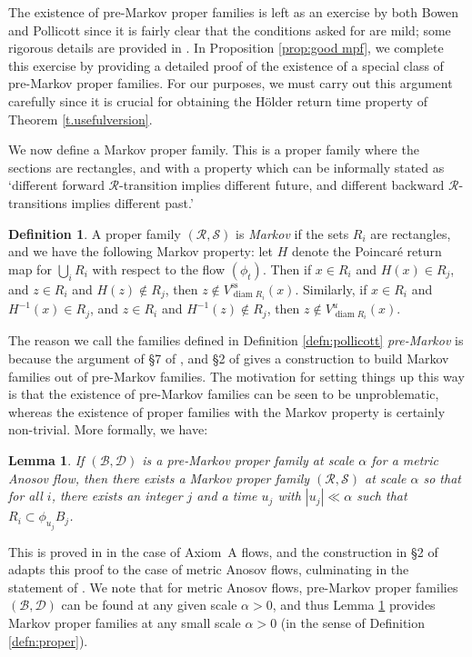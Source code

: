 \documentclass[10pt]{amsart}
\let\mathcal\mathscr
\newcommand{\sts}{\mathrm{ss}}
\newtheorem{lem}[thm]{Lemma}
\theoremstyle{definition}
\newtheorem{defn}[thm]{Definition}
\numberwithin{equation}{section}
\DeclareMathOperator{\diam}{diam}
\newcommand\DDD{\mathcal D}
\newcommand\BBB{\mathcal B}
\newcommand\RRR{\mathcal R}
\newcommand\SSS{\mathcal S}
\begin{document}
The existence of pre-Markov proper families is left as an exercise by both Bowen and Pollicott since it is fairly clear that the conditions asked for are mild; some rigorous details are provided in \cite{BW}. In Proposition \ref{prop:good mpf}, we complete this exercise by providing a detailed proof of the existence of a special class of pre-Markov proper families. For our purposes, we must carry out this argument carefully since it is crucial for obtaining the Hölder return time property of Theorem \ref{t.usefulversion}.

We now define a Markov proper family. This is a proper family where the sections are rectangles, and with a property which can be informally stated as `different forward $\RRR$-transition implies different future, and different backward $\RRR$-transitions implies different past.'

\begin{defn}
A proper family $(\RRR, \SSS)$ is \emph{Markov} if the sets $R_i$ are rectangles, and we have the following Markov property: let $H$ denote the Poincaré return map for $\bigcup_i R_i$ with respect to the flow $(\phi_t)$. Then if $ x \in R_i$ and $ H(x) \in R_j$, and $z \in R_i$ and $H(z) \notin R_j$, then $z \notin V^{\sts}_{\diam R_i}(x)$. Similarly, if $ x \in R_i$ and $ H^{-1}(x) \in R_j$, and $z \in R_i$ and $H^{-1}(z) \notin R_j$, then $z \notin V^u_{\diam R_i}(x)$.
\end{defn}

The reason we call the families defined in Definition \ref{defn:pollicott} \emph{pre-Markov} is because the argument of \S7 of \cite{bowen-symbolic}, and \S2 of \cite{pollicott} gives a construction to build Markov families out of pre-Markov families. The motivation for setting things up this way is that the existence of pre-Markov families can be seen to be unproblematic, whereas the existence of proper families with the Markov property is certainly non-trivial. More formally, we have:

\begin{lem} \label{PtoB}
If $(\BBB, \DDD)$ is a pre-Markov proper family at scale $\alpha$ for a metric Anosov flow, then there exists a Markov proper family $(\RRR, \SSS)$ at scale $\alpha$ so that for all $i$, there exists an integer $j$ and a time $u_j$ with $|u_j|\ll \alpha$ such that $R_i \subset \phi_{u_j}B_j$.
\end{lem}

This is proved in \cite[\S7]{bowen-symbolic} in the case of Axiom~A flows, and the construction in \S2 of \cite{pollicott} adapts this proof to the case of metric Anosov flows, culminating in the statement of \cite[\S 2.2 `Key Lemma']{pollicott}. We note that for metric Anosov flows, pre-Markov proper families $(\BBB, \DDD)$ can be found at any given scale $\alpha>0$, and thus Lemma \ref{PtoB} provides Markov proper families at any small scale $\alpha>0$ (in the sense of Definition \ref{defn:proper}).
\end{document}
